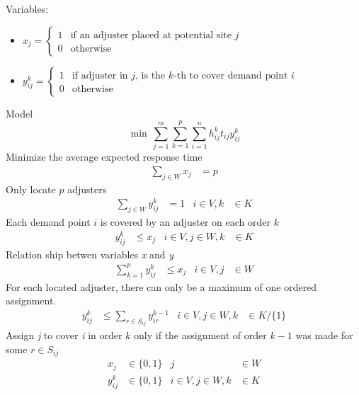 Variables:
\begin{itemize}
\item $x_j =
  \begin{cases} 
    1 & \mbox{if an adjuster placed at potential site } j \\
    0 & \mbox{otherwise}
  \end{cases}$
\item $y_{ij}^{k} =
  \begin{cases} 
    1 & \mbox{if adjuster in } j \mbox{, is the }
    k\mbox{-th to cover demand point } i \\
    0 & \mbox{otherwise}
  \end{cases}$
\end{itemize}

Model
{\small
  \begin{equation}
    \min \, \sum_{j=1}^{m}{
      \sum_{k=1}^{p}{
        \sum_{i=1}^{n}{
          h_{ij}^{k}t_{ij}y_{ij}^{k}
        }
      }
    }
  \end{equation}
}
Minimize the average expected response time
\begin{align}
  \label{eq:2}
  \sum_{j \in W}{x_j}
  & = p
\end{align}
Only locate $p$ adjusters
\begin{align}
  \label{eq:3}
  \sum_{j \in W}{y_{ij}^{k}}
  & = 1
  & i \in V, k
  &\in K
\end{align}
Each demand point $i$ is covered by an adjuster on each order $k$
\begin{align}
  \label{eq:4}
  y_{ij}^{k}
  & \leq x_j
  & i \in V,j \in W, k
  &\in K
\end{align}
Relation ship betwen variables \textit{x} and \textit{y}
\begin{align}
  \label{eq:5}
  \sum_{k = 1}^{p}{
    y_{ij}^{k}
  }
  & \leq x_j
  & i \in V, j 
  & \in W
\end{align}
For each located adjuster,
there can only be
a maximum of one ordered assignment.
\begin{align}
  y_{ij}^{k} 
  & \leq \sum_{r\in S_{ij}}{y_{ir}^{k-1}}
  & i \in V,j \in W, k
  & \in K/\{1\}
\end{align}
Assign \textit{j} to cover \textit{i} in order $k$
only if
the assignment of order $k-1$
was made for some $r \in S_{ij}$
\begin{align}
  x_{j}
  & \in \{0,1\}
  & j 
  & \in W \nonumber
  \\
  y_{ij}^{k}
  & \in \{0,1\}
  &  i \in V,j \in W,k
  &\in K \nonumber
\end{align}

